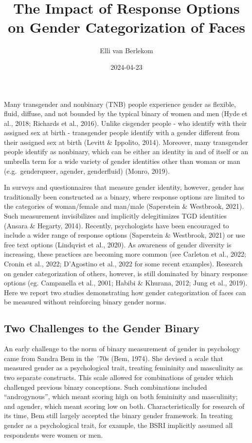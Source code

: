 \documentclass[
  man,
  longtable,
  nolmodern,
  notxfonts,
  notimes,
  colorlinks=true,linkcolor=blue,citecolor=blue,urlcolor=blue]{apa7}
\title{The Impact of Response Options on Gender Categorization of Faces}
\author{Elli van Berlekom}
\affiliation{
{Psychology, Stockholm University}}
\date{2024-04-23}
\begin{document}
\maketitle


\setcounter{secnumdepth}{-\maxdimen} %

\setlength\LTleft{0pt}




Many transgender and nonbinary (TNB) people experience gender as
flexible, fluid, diffuse, and not bounded by the typical binary of women
and men (Hyde et al., 2018; Richards et al., 2016). Unlike cisgender
people - who identify with their assigned sex at birth - transgender
people identify with a gender different from their assigned sex at birth
(Levitt \& Ippolito, 2014). Moreover, many transgender people identify
as nonbinary, which can be either an identity in and of itself or an
umbrella term for a wide variety of gender identities other than woman
or man (e.g.~genderqueer, agender, genderfluid) (Monro, 2019).

In surveys and questionnaires that measure gender identity, however,
gender has traditionally been constructed as a binary, where response
options are limited to the categories of woman/female and man/male
(Saperstein \& Westbrook, 2021). Such measurement invisibilizes and
implicitly delegitimizes TGD identities (Ansara \& Hegarty, 2014).
Recently, psychologists have been encouraged to include a wider range of
response options (Saperstein \& Westbrook, 2021) or use free text
options (Lindqvist et al., 2020). As awareness of gender diversity is
increasing, these practices are becoming more common (see Carleton et
al., 2022; Cronin et al., 2022; D'Agostino et al., 2022 for some recent
examples). Research on gender categorization of others, however, is
still dominated by binary response options (eg. Campanella et al., 2001;
Habibi \& Khurana, 2012; Jung et al., 2019). Here we report two studies
demonstrating how gender categorization of faces can be measured without
reinforcing binary gender norms.

\subsection{Two Challenges to the Gender
Binary}\label{two-challenges-to-the-gender-binary}

An early challenge to the norm of binary measurement of gender in
psychology came from Sandra Bem in the ´70s (Bem, 1974). She devised a
scale that measured gender as a psychological trait, treating femininity
and masculinity as two separate constructs. This scale allowed for
combinations of gender which challenged previous binary conceptions.
Such combinations included ``androgynous'', which meant scoring high on
both femininity and masculinity; and agender, which meant scoring low on
both. Characteristically for research of its time, Bem still largely
accepted the binary gender framework. In treating gender as a
psychological trait, for example, the BSRI implicitly assumed all
respondents were women or men.
\end{document}
